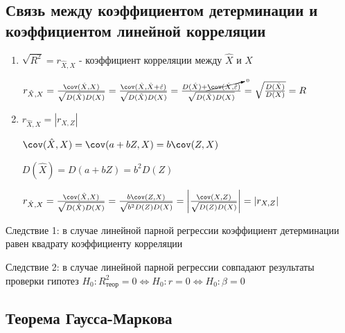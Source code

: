 \documentclass[12pt]{article}
\begin{document}
\hypertarget{correlation_coefficient_connection}{}

\subsection{Связь между коэффициентом детерминации и коэффициентом линейной корреляции}

\begin{enumerate}
    \item $\sqrt{R^2} = r_{\hat X, X}$ - коэффициент корреляции между $\hat X$ и $X$
    \begin{MyProof}
        $r_{\hat X, X} = \frac{\cov (\hat X, X)}{\sqrt{D(\hat X) D(X)}} = \frac{\cov (\hat X, \hat X + \hat \varepsilon)}{\sqrt{D(\hat X) D(X)}} = 
        \frac{D(\hat X) + \cancelto{0}{\cov (\hat X, \hat \varepsilon)}}{\sqrt{D(\hat X) D(X)}} = \sqrt{\frac{D(\hat X)}{D(X)}} = R$
    \end{MyProof}

    \item $r_{\hat X, X} = |r_{X, Z}|$

    \begin{MyProof}
        $\cov (\hat X, X) = \cov (a + bZ, X) = b \cov (Z, X)$

        $D(\hat X) = D(a + b Z) = b^2 D(Z)$

        $r_{\hat X, X} = \frac{\cov (\hat X, X)}{\sqrt{D(\hat X) D(X)}} = \frac{b \cov (Z, X)}{\sqrt{b^2 D(Z) D(X)}} = \left|\frac{\cov (X, Z)}{\sqrt{D(Z) D(X)}}\right| = |r_{X, Z}|$
    \end{MyProof}
\end{enumerate}

Следствие 1: в случае линейной парной регрессии коэффициент детерминации равен квадрату коэффициенту корреляции

Следствие 2: в случае линейной парной регрессии совпадают результаты проверки гипотез 
$H_0 : R^2_{\text{теор}} = 0 \Longleftrightarrow H_0 : r = 0 \Longleftrightarrow H_0 : \beta = 0$

\subsection{Теорема Гаусса-Маркова}

\hypertarget{gauss_markov_theorem}{}
\end{document}
